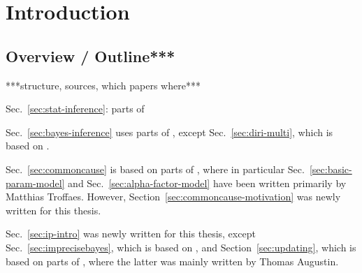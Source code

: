 \chapter{Introduction}



\section{Overview / Outline***}

***structure, sources, which papers where***

Sec.~\ref{sec:stat-inference}: parts of \textcite[\S\S 1.1, 1.2, 1.5]{itip-statinf}

Sec.~\ref{sec:bayes-inference} uses parts of \textcite[\S\S 1.3, 1.4, 4.1]{itip-statinf},
except Sec.~\ref{sec:diri-multi}, which is based on \textcite{Walter2012b}.



Sec.~\ref{sec:commoncause} is based on parts of \textcite{Troffaes2013a},
where in particular Sec.~\ref{sec:basic-param-model} and Sec.~\ref{sec:alpha-factor-model}
have been written primarily by Matthias Troffaes.
However, Section~\ref{sec:commoncause-motivation} was newly written for this thesis.


Sec.~\ref{sec:ip-intro} was newly written for this thesis,
except Sec.~\ref{sec:imprecisebayes}, which is based on \textcite[\S 4.2]{itip-statinf},
and Section~\ref{sec:updating}, which is based on parts of \textcite[\S 4.4]{itip-statinf},
where the latter was mainly written by Thomas Augustin.

